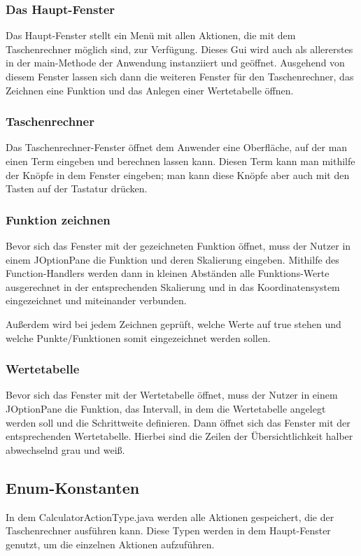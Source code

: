 \documentclass[12pt,a4paper]{article}
\begin{document}
    \subsubsection{Das Haupt-Fenster}
    Das Haupt-Fenster stellt ein Menü mit allen Aktionen, die mit dem Taschenrechner möglich sind, zur Verfügung.
    Dieses Gui wird auch als allererstes in der main-Methode der Anwendung instanziiert und geöffnet.
    Ausgehend von diesem Fenster lassen sich dann die weiteren Fenster für den Taschenrechner,
    das Zeichnen eine Funktion und das Anlegen einer Wertetabelle öffnen.

    \subsubsection{Taschenrechner}
    Das Taschenrechner-Fenster öffnet dem Anwender eine Oberfläche, auf der man einen Term eingeben und berechnen lassen kann.
    Diesen Term kann man mithilfe der Knöpfe in dem Fenster eingeben; man kann diese Knöpfe aber auch mit den Tasten
    auf der Tastatur drücken.

    \subsubsection{Funktion zeichnen}
    Bevor sich das Fenster mit der gezeichneten Funktion öffnet, muss der Nutzer in einem JOptionPane die Funktion
    und deren Skalierung eingeben.
    Mithilfe des Function-Handlers werden dann in kleinen Abständen alle Funktions-Werte ausgerechnet in der
    entsprechenden Skalierung und in das Koordinatensystem eingezeichnet und miteinander verbunden.\par
    Außerdem wird bei jedem Zeichnen geprüft, welche Werte auf true stehen und welche Punkte/Funktionen somit
    eingezeichnet werden sollen.

    \subsubsection{Wertetabelle}
    Bevor sich das Fenster mit der Wertetabelle öffnet, muss der Nutzer in einem JOptionPane die Funktion, das Intervall,
    in dem die Wertetabelle angelegt werden soll und die Schrittweite definieren.
    Dann öffnet sich das Fenster mit der entsprechenden Wertetabelle.
    Hierbei sind die Zeilen der Übersichtlichkeit halber abwechselnd grau und weiß.

    \subsection{Enum-Konstanten}
    In dem CalculatorActionType.java werden alle Aktionen gespeichert, die der Taschenrechner ausführen kann.
    Diese Typen werden in dem Haupt-Fenster genutzt, um die einzelnen Aktionen aufzuführen.
\end{document}

